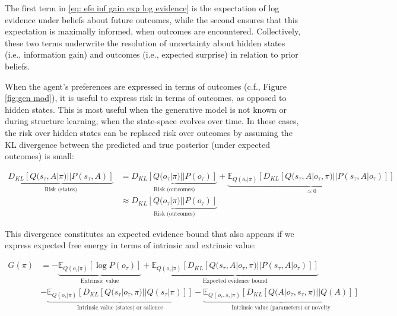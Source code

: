 \documentclass{article}
\begin{document}
The first term in \eqref{eq: efe inf gain exp log evidence} is the expectation of log evidence under beliefs about future outcomes, while the second ensures that this expectation is maximally informed, when outcomes are encountered. Collectively, these two terms underwrite the resolution of uncertainty about hidden states (i.e., information gain) and outcomes (i.e., expected surprise) in relation to prior beliefs.

When the agent's preferences are expressed in terms of outcomes (c.f., Figure \ref{fig:gen mod}), it is useful to express risk in terms of outcomes, as opposed to hidden states. This is most useful when the generative model is not known or during structure learning, when the state-space evolves over time. In these cases, the risk over hidden states can be replaced risk over outcomes by assuming the KL divergence between the predicted and true posterior (under expected outcomes) is small:

\begin{equation}
\label{eq:pref outcomes}
\begin{split}
        \underbrace{D_{KL}[Q(s_\tau, A|\pi)||P(s_\tau, A)]}_{\text{Risk (states)}} &=\underbrace{D_{KL}[Q(o_\tau|\pi)||P(o_\tau)]}_{\text{Risk (outcomes)}}+\underbrace{\mathbb E_{Q(o_\tau |\pi)}[D_{KL}[Q(s_\tau, A|o_\tau, \pi)||P(s_\tau, A|o_\tau)]]}_{\approx 0} \\
        &\approx \underbrace{D_{KL}[Q(o_\tau|\pi)||P(o_\tau)]}_{\text{Risk (outcomes)}}
\end{split}
\end{equation}

This divergence constitutes an expected evidence bound that also appears if we express expected free energy in terms of intrinsic and extrinsic value:

\begin{equation}
\begin{split}
       G(\pi) &= -\underbrace{\mathbb E_{Q(o_\tau |\pi)}[\log P(o_\tau)]}_{\text{Extrinsic value}}+ \underbrace{\mathbb E_{Q(o_\tau|\pi)}[D_{KL}[Q(s_\tau, A|o_\tau, \pi)||P(s_\tau, A|o_\tau)]]}_{\text{Expected evidence bound}} \\
       &-\underbrace{\mathbb E_{Q(o_\tau|\pi)}[D_{KL}[Q(s_\tau|o_\tau, \pi)||Q(s_\tau |\pi)]]}_{\text{Intrinsic value (states) or salience}}
       - \underbrace{\mathbb E_{Q(o_\tau,s_\tau|\pi)}[D_{KL}[Q(A|o_\tau, s_\tau, \pi)||Q(A)]]}_{\text{Intrinsic value (parameters) or novelty}}
\end{split}
\end{equation}
\end{document}
